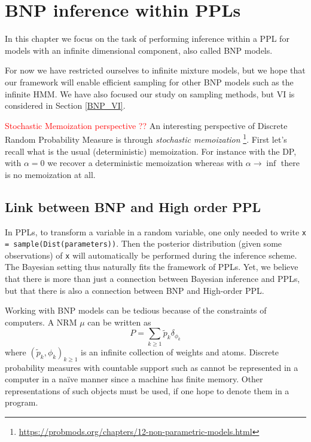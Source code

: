
\chapter{\gls{BNP} inference within \glspl{PPL}} \label{BNP_PPL}
In this chapter we focus on the task of performing inference within a \gls{PPL} for models with an infinite dimensional component, also called \gls{BNP} models.

For now we have restricted ourselves to infinite mixture models, but we hope that our framework will enable efficient sampling for other \gls{BNP} models such as the infinite \acrlong{HMM}. We have also focused our study on sampling methods, but \acrlong{VI} is considered in Section \ref{BNP_VI}.

\textcolor{red}{Stochastic Memoization perspective ??}
An interesting perspective of Discrete Random Probability Measure is through \textit{stochastic memoization} \footnote{\url{https://probmods.org/chapters/12-non-parametric-models.html}}.
First let's recall what is the usual (deterministic) memoization.
For instance with the \gls{DP}, with $\alpha = 0$ we recover a deterministic memoization whereas with $\alpha \rightarrow \inf$ there is no memoization at all.


\section{Link between BNP and High order PPL}

In \glspl{PPL}, to transform a variable in a random variable, one only needed to write \texttt{x = sample(Dist(parameters))}. Then the posterior distribution (given some observations) of \texttt{x} will automatically be performed during the inference scheme.
The Bayesian setting thus naturally fits the framework of \glspl{PPL}.
Yet, we believe that there is more  than just a connection between Bayesian inference and \glspl{PPL}, but that there is also a connection between \acrlong{BNP} and High-order \gls{PPL}.

Working with \gls{BNP} models can be tedious because of the constraints of computers.
A \gls{NRM} $\mu$ can be written \cite{Kingman:1967kn} as
$$P = \sum_{k \ge 1}{\tilde{p}_k \delta_{\phi_k}} $$
where $\left(\tilde{p}_k, \phi_k \right)_{k \ge 1}$ is an infinite collection of weights and atoms.
Discrete probability measures with countable support such as  cannot be represented in a computer in a naïve manner since a machine has finite memory.
Other representations of such objects must be used, if one hope to denote them in a program.

